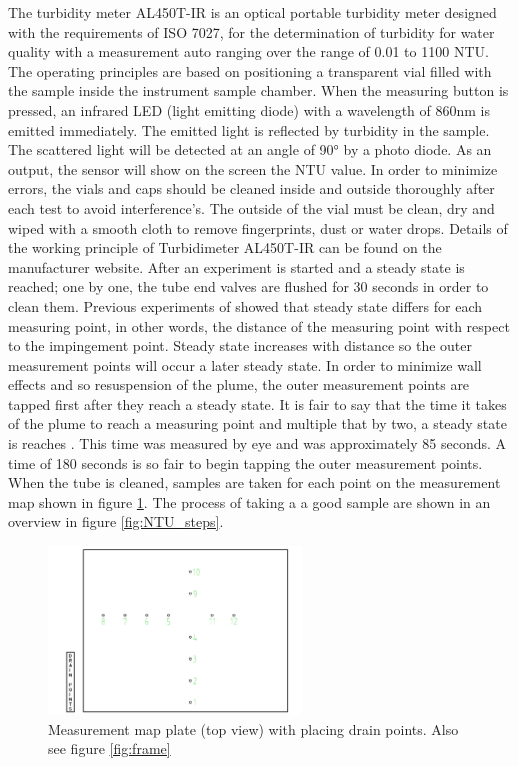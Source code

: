 \noindent The turbidity meter AL450T-IR is an optical portable turbidity meter designed with the requirements of ISO 7027, for the determination of turbidity for water quality with a measurement auto ranging over the range of 0.01 to 1100 NTU. The operating principles are based on positioning a transparent vial filled with the sample inside the instrument sample chamber. When the measuring button is pressed, an infrared LED (light emitting diode) with a wavelength of 860nm is emitted immediately. The emitted light is reflected by turbidity in the sample. The scattered light will be detected at an angle of 90° by a photo diode.\newline
\noindent As an output, the sensor will show on the screen the NTU value. In order to minimize errors, the vials and caps should be cleaned inside and outside thoroughly after each test to avoid interference's. The outside of the vial must be clean, dry and wiped with a smooth cloth to remove fingerprints, dust or water drops. Details of the working principle of Turbidimeter AL450T-IR can be found on the manufacturer website. \citep{website:Turbidity} \newline
\noindent After an experiment is started and a steady state is reached; one by one, the tube end valves are flushed for 30 seconds in order to clean them. Previous experiments of \cite{Byishimo} showed that steady state differs for each measuring point, in other words, the distance of the measuring point with respect to the impingement point. Steady state increases with distance so the outer measurement points will occur a later steady state. In order to minimize wall effects and so resuspension of the plume, the outer measurement points are tapped first after they reach a steady state. It is fair to say that the time it takes of the plume to reach a measuring point and multiple that by two, a steady state is reaches \citep{Byishimo}. This time was measured by eye and was approximately 85 seconds. A time of 180 seconds is so fair to begin tapping the outer measurement points. When the tube is cleaned, samples are taken for each point on the measurement map shown in figure \ref{fig:plaat_meetpunten}. The process of taking a a good sample are shown in an overview in figure \ref{fig:NTU_steps}.


\begin{figure}[ht!]
    \centering
    \includegraphics[width=0.6\textwidth]{Images/meetpunten.png}
    \caption{Measurement map plate (top view) with placing drain points. Also see figure \ref{fig:frame}}
    \label{fig:plaat_meetpunten}
\end{figure}

